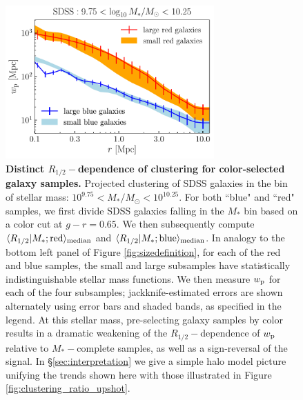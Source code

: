 \documentclass[usenatbib,usegraphicx,letterpaper]{mn2e}
\newcommand{\rhalf}{R_{1/2}}
\newcommand{\mstar}{M_{\ast}}
\newcommand{\wproj}{w_{\rm p}}
\newcommand{\median}[2]{\langle{#1}\vert{#2}\rangle_{\rm median}}
\newcommand{\msun}{M_\odot}
\begin{document}
\begin{figure}
\centering
\includegraphics[width=8cm]{FIGS/color_selected_size_dependent_clustering.pdf}
\caption{
{\bf Distinct $\rhalf-$dependence of clustering for color-selected galaxy samples.}
Projected clustering of SDSS galaxies in the bin of stellar mass: $10^{9.75}<\mstar/\msun<10^{10.25}.$ For both ``blue" and ``red" samples, we first divide SDSS galaxies falling in the $\mstar$ bin based on a color cut at $g-r=0.65.$ We then subsequently compute $\median{\rhalf}{\mstar; {\rm red}}$ and $\median{\rhalf}{\mstar; {\rm blue}}$. In analogy to the bottom left panel of Figure \ref{fig:sizedefinition}, for each of the red and blue samples, the small and large subsamples have statistically indistinguishable stellar mass functions. We then measure $\wproj$ for each of the four subsamples; jackknife-estimated errors are shown alternately using error bars and shaded bands, as specified in the legend. At this stellar mass, pre-selecting galaxy samples by color results in a dramatic weakening of the $\rhalf-$dependence of $\wproj$ relative to $\mstar-$complete samples, as well as a sign-reversal of the signal. In \S\ref{sec:interpretation} we give a simple halo model picture unifying the trends shown here with those illustrated in Figure \ref{fig:clustering_ratio_upshot}.
}
\label{fig:colorclustering}
\end{figure}
\end{document}
